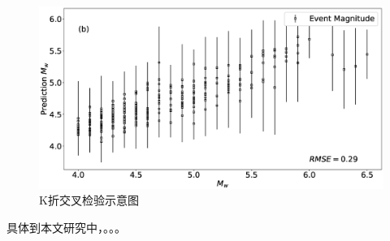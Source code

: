  \begin{figure}[ht]
  \centering
  \includegraphics[width=\linewidth]{img/7b.eps}
  \caption{K折交叉检验示意图}\label{fig:yinglimoxin}
\end{figure}



\indent 具体到本文研究中，。。。